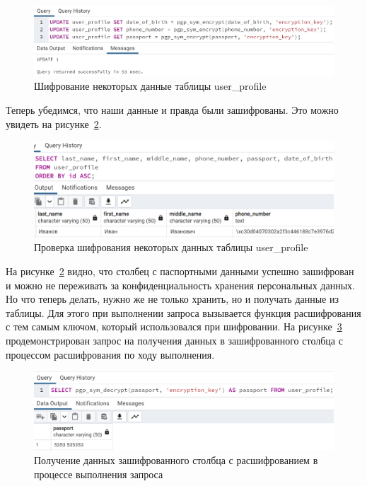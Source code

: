 \begin{figure}
  \includegraphics[scale=0.51]{inc/encryption}
  \caption{Шифрование некоторых данные таблицы user\_profile}
  \label{fig:fig17}
\end{figure}

Теперь убедимся, что наши данные и правда были зашифрованы. Это можно увидеть на рисунке~\ref{fig:fig18}.

\begin{figure}
  \includegraphics[scale=0.6]{inc/encrypted_table}
  \caption{Проверка шифрования некоторых данных таблицы user\_profile}
  \label{fig:fig18}
\end{figure}

На рисунке~\ref{fig:fig18} видно, что столбец с паспортными данными успешно зашифрован и можно не переживать за конфиденциальность хранения персональных данных. Но что теперь делать, нужно же не только хранить, но и получать данные из таблицы. Для этого при выполнении запроса вызывается функция расшифрования с тем самым ключом, который использовался при шифровании. На рисунке~\ref{fig:fig19} продемонстрирован запрос на получения данных в зашифрованного столбца с процессом расшифрования по ходу выполнения.

\begin{figure}
  \includegraphics[scale=0.847]{inc/decryption}
  \caption{Получение данных зашифрованного столбца с расшифрованием в процессе выполнения запроса}
  \label{fig:fig19}
\end{figure}

